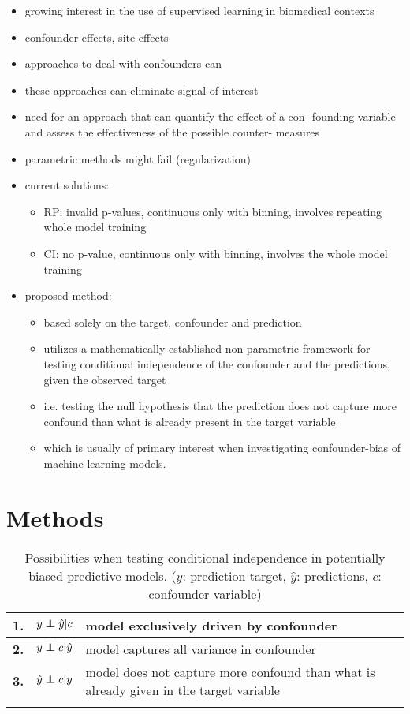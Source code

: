 \documentclass{article}
\theoremstyle{definition}
\newcommand\independent{\protect\mathpalette{\protect\independenT}{\perp}}
\def\independenT#1#2{\mathrel{\rlap{$#1#2$}\mkern2mu{#1#2}}}
\begin{document}
\begin{itemize}
    \item growing interest in the use of
supervised learning in biomedical contexts
    \item confounder effects, site-effects
    \item approaches to deal with confounders can
    \item these approaches can eliminate signal-of-interest
    \item need for an approach that can quantify the effect of a con- founding variable and assess the effectiveness of the possible counter- measures
    \item parametric methods might fail (regularization)
    \item current solutions:
    \begin{itemize}
        \item RP: invalid p-values, continuous only with binning, involves repeating whole model training
        \item CI: no p-value, continuous only with binning, involves the whole model training
    \end{itemize}
    \item proposed method:
    \begin{itemize}
        \item based solely on the target, confounder and prediction
        \item utilizes a mathematically established non-parametric framework for testing conditional independence of the confounder and the predictions, given the observed target
        \item i.e. testing the null hypothesis that the prediction does not capture more confound than what is already present in the target variable
        \item which is usually of primary interest when investigating confounder-bias of machine learning models.
    \end{itemize}
\end{itemize}


\section{Methods}

\renewcommand{\arraystretch}{2}
\begin{table}[]
\begin{tabular}{lll}
\textbf{1.} & $y \independent \hat{y} | c$  & \quad model exclusively driven by confounder  \\
\hline
\textbf{2.} & $y \independent c | \hat{y}$ &  \quad model captures all variance in confounder \\
\hline
\textbf{3.} & $\hat{y} \independent c | y$ &   \quad model does not capture more confound than what is already given in the target variable\\
 &  
\end{tabular}
\caption{\label{tab:conditional-independence-cases} Possibilities when testing conditional independence in potentially biased predictive models. ($y$: prediction target, $\hat{y}$: predictions, $c$: confounder variable) }
\end{table}
\end{document}
